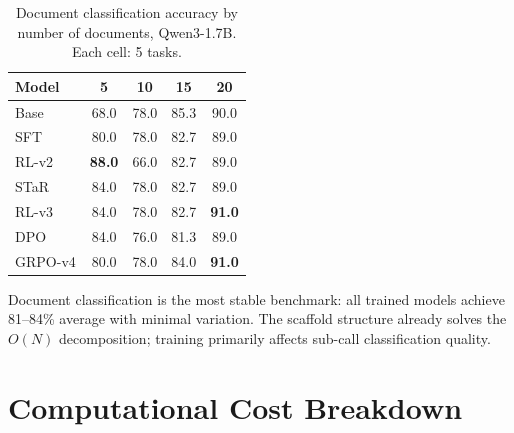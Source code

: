 \documentclass{article}
\begin{document}
\begin{table}[t]
\caption{Document classification accuracy by number of documents, Qwen3-1.7B. Each cell: 5 tasks.}
\label{tab:docclassify}
\vskip 0.15in
\begin{center}
\begin{small}
\begin{sc}
\begin{tabular}{lcccc}
\toprule
Model & 5 & 10 & 15 & 20 \\
\midrule
Base  & 68.0 & 78.0 & 85.3 & 90.0 \\
SFT   & 80.0 & 78.0 & 82.7 & 89.0 \\
RL-v2 & \textbf{88.0} & 66.0 & 82.7 & 89.0 \\
STaR  & 84.0 & 78.0 & 82.7 & 89.0 \\
RL-v3 & 84.0 & 78.0 & 82.7 & \textbf{91.0} \\
\midrule
DPO   & 84.0 & 76.0 & 81.3 & 89.0 \\
GRPO-v4 & 80.0 & 78.0 & 84.0 & \textbf{91.0} \\
\bottomrule
\end{tabular}
\end{sc}
\end{small}
\end{center}
\vskip -0.15in
\end{table}

Document classification is the most stable benchmark: all trained models achieve 81--84\% average with minimal variation. The scaffold structure already solves the $O(N)$ decomposition; training primarily affects sub-call classification quality.

\section{Computational Cost Breakdown}
\label{app:compute}
\end{document}
